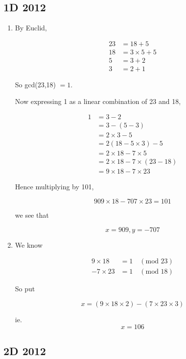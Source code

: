 \documentclass[a4paper]{article}
\begin{document}
	
\maketitle


\subsection*{1D 2012}

\begin{enumerate}
	\item By Euclid,
	
	\begin{align*}
	23 & = 18 + 5 \\
	18 & = 3 \times 5 + 5\\
	5 & = 3 + 2\\
	3 & = 2 + 1 
	\end{align*}
	
	So gcd(23,18) $ = 1 $.
	
	Now expressing 1 as a linear combination of 23 and 18,
	
	\begin{align*}
	1 & = 3 - 2 \\
	& = 3 - (5 - 3) \\
	& = 2 \times 3 - 5 \\
	& = 2(18 - 5 \times 3) - 5\\
	& = 2 \times 18 - 7 \times 5 \\
	& = 2 \times 18 - 7 \times (23 - 18) \\
	& = 9 \times 18 - 7 \times 23
	\end{align*}
	
Hence multiplying by 101,

\[ 909 \times 18 - 707 \times 23 = 101 \]

we see that

\[ x = 909, y = - 707 \]

\item We know 

\begin{align*}
9 \times 18 & = 1 \quad (\text{mod } 23) \\
-7 \times 23 & = 1 \quad (\text{mod } 18)
\end{align*}

So put 

\[ x = (9 \times 18 \times 2) - (7 \times 23 \times 3) \]

ie. \[ x = 106 \]
\end{enumerate}


\subsection*{2D 2012}
\end{document}
